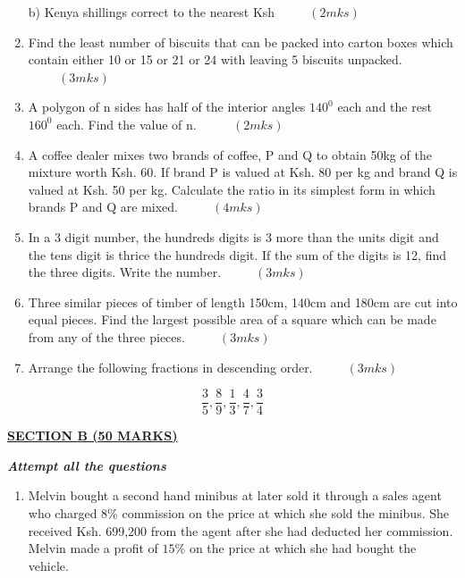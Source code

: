 \documentclass[
  a4paperpaper,
]{scrbook}
\begin{document}
\begin{tcolorbox}
\begin{enumerate}
  b) Kenya shillings correct to the nearest Ksh \(\hspace{1cm}(2mks)\)
\item
  Find the least number of biscuits that can be packed into carton boxes
  which contain either 10 or 15 or 21 or 24 with leaving 5 biscuits
  unpacked. \(\hspace{1cm} (3mks)\)
\item
  A polygon of n sides has half of the interior angles \(140^0\) each
  and the rest \(160^0\) each. Find the value of
  n.~\(\hspace{1cm} (2mks)\)
\item
  A coffee dealer mixes two brands of coffee, P and Q to obtain 50kg of
  the mixture worth Ksh. 60. If brand P is valued at Ksh. 80 per kg and
  brand Q is valued at Ksh. 50 per kg. Calculate the ratio in its
  simplest form in which brands P and Q are mixed.
  \(\hspace{1cm}(4mks)\)
\item
  In a 3 digit number, the hundreds digits is 3 more than the units
  digit and the tens digit is thrice the hundreds digit. If the sum of
  the digits is 12, find the three digits. Write the number.
  \(\hspace{1cm}(3mks)\)
\item
  Three similar pieces of timber of length 150cm, 140cm and 180cm are
  cut into equal pieces. Find the largest possible area of a square
  which can be made from any of the three pieces.
  \(\hspace{1cm} (3mks)\)
\item
  Arrange the following fractions in descending order.
  \(\hspace{1cm} (3mks)\)
\end{enumerate}

\[ \frac{3}{5},\frac{8}{9},\frac{1}{3},\frac{4}{7},\frac{3}{4}\]

\ul{\textbf{SECTION B (50 MARKS)}}

\textbf{\emph{Attempt all the questions}}

\begin{enumerate}
\def\labelenumi{\arabic{enumi}.}
\setcounter{enumi}{16}
\item
  Melvin bought a second hand minibus at later sold it through a sales
  agent who charged \(8\%\) commission on the price at which she sold
  the minibus. She received Ksh. 699,200 from the agent after she had
  deducted her commission. Melvin made a profit of \(15\%\) on the price
  at which she had bought the vehicle.


\end{enumerate}
\end{tcolorbox}
\end{document}
